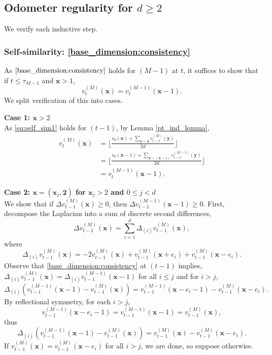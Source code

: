 \documentclass[12pt]{amsart}
\begin{document}
	


\subsection{Odometer regularity for \texorpdfstring{$d \geq 2$}{d >= 2}}

We verify each inductive step. 


\subsubsection*{Self-similarity: \eqref{base_dimension:consistency}}
As $\eqref{base_dimension:consistency}$ holds for $(M-1)$ at $t$, it suffices to show 
that if $t \leq \tau_{M-1}$ and $\mathbf{x} > 1$,
\begin{equation}\label{eq:self_sim1}
v_t^{(M)}(\mathbf{x}) = v_t^{(M-1)}(\mathbf{x}-1).
\end{equation}
We split verification of this into cases. 

{\bf Case 1: $\mathbf{x} > 2$} \\ 
As \eqref{eq:self_sim1} holds for $(t-1)$, by Lemma \ref{pt_ind_lemma}, 
\begin{align*}
v_{t}^{(M)}(\mathbf{x}) &= \lfloor \frac{ s_0(\mathbf{x}) + \sum_{\mathbf{y} \sim \mathbf{x}} v_{t-1}^{(M)}(\mathbf{y}) }{2 d} \rfloor \\
&= \lfloor \frac{ s_0(\mathbf{x}-1) + \sum_{\mathbf{y} \sim (\mathbf{x}-1)} v_{t-1}^{(M-1)}(\mathbf{y})}{2 d} \rfloor \\
&= v_t^{(M-1)}(\mathbf{x}-1).
\end{align*}

{\bf Case 2:  $\mathbf{x} = (\mathbf{x}_j, \mathbf{2})$ for $\mathbf{x}_j > 2$ and $0 \leq j < d$ } \\
We show that if $\Delta v_{t-1}^{(M)}(\mathbf{x}) \geq 0$, then  $\Delta v_{t-1}^{(M-1)}(\mathbf{x}-1) \geq 0$.
First, decompose the Laplacian into a sum of discrete second differences,
\[
\Delta v_{t-1}^{(M)}(\mathbf{x}) = \sum_{i=1}^d \Delta_{(i)} v_{t-1}^{(M)}(\mathbf{x}),
\]
where 
\[
\Delta_{(i)} v_{t-1}^{(M)}(\mathbf{x}) =  - 2 v_{t-1}^{(M)}(\mathbf{x}) + v_{t-1}^{(M)}(\mathbf{x}+e_i) + v_{t-1}^{(M)}(\mathbf{x}-e_i). 
\]
Observe that \eqref{base_dimension:consistency} at $(t-1)$ implies, 
$\Delta_{(i)} v_{t-1}^{(M)}(\mathbf{x}) = \Delta_{(i)} v_{t-1}^{(M-1)}(\mathbf{x}-1)$
for all $i \leq j$ and for $i > j$, 
\[
\Delta_{(i)} (v_{t-1}^{(M-1)}(\mathbf{x}-1) - v_{t-1}^{(M)}(\mathbf{x})) = v_{t-1}^{(M-1)}(\mathbf{x}-e_i-1) - v_{t-1}^{(M)}(\mathbf{x}-e_i).
\]
By reflectional symmetry, for each $i > j$, 
\[
v_{t-1}^{(M-1)}(\mathbf{x}-e_i-1) = v_{t-1}^{(M-1)}(\mathbf{x}-1) = v_{t-1}^{(M)}(\mathbf{x}),
\]
thus 
\begin{equation} \label{eq:difference}
\Delta_{(i)} (v_{t-1}^{(M-1)}(\mathbf{x}-1) - v_{t-1}^{(M)}(\mathbf{x}))  = v_{t-1}^{(M)}(\mathbf{x}) - v_{t-1}^{(M)}(\mathbf{x}-e_i).
\end{equation}
If $v_{t-1}^{(M)}(\mathbf{x}) = v_{t-1}^{(M)}(\mathbf{x}-e_i)$ for all $i > j$, we are done, so suppose otherwise.
\end{document}
